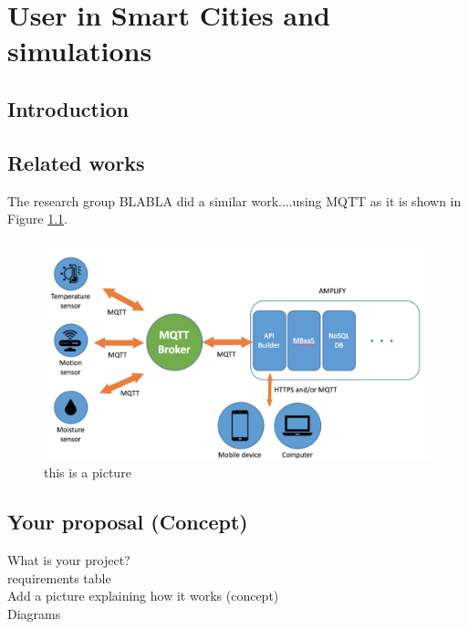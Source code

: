 \chapter{User in Smart Cities and simulations}
\label{intro} 



\section{Introduction}
\label{sec:1}


\section{Related works}
\label{sec:2}

The research group BLABLA \cite{cheng2015building} did a similar work....using MQTT as it is shown in Figure \ref{fig:1}.
\begin{figure}
\sidecaption
\includegraphics[scale=.09]{images/figure.png}
\caption{this is a picture}
\label{fig:1}
\end{figure}


\section{Your proposal (Concept)}
\label{sec:3}
   What is your project?
\\ requirements table
\\ Add a picture explaining how it works (concept)
\\ Diagrams
\\

